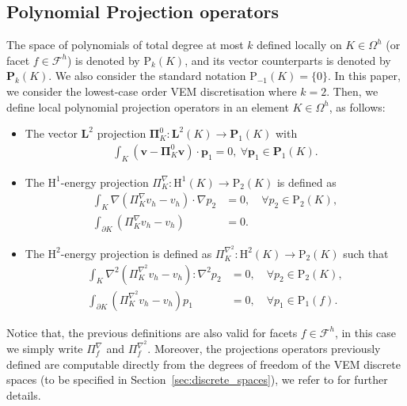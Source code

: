 \documentclass[final,reqno]{elsarticle}
\newcommand\rP{\mathrm{P}}
\def\bL{\mathbf{L}}
\def\bP{\mathbf{P}}
\def\bp{\mathbf{p}}
\def\bv{\mathbf{v}}
\def\bPi{\mathbf{\Pi}}
\def\rH{\mathrm{H}}
\def\rP{\mathrm{P}}
\begin{document}
\subsection{Polynomial Projection operators}
The space of polynomials of total degree at most $k$ defined locally on $K\in \Omega^h$ (or facet $f\in \mathcal{F}^h$) is denoted by $\rP_k (K)$, and its vector counterparts is denoted by $\mathbf{P}_k(K)$. We also consider the standard notation $\rP_{-1}(K)=\{0\}$. In this paper, we consider the lowest-case order VEM discretisation where $k=2$. Then, we define local polynomial projection operators in an element $K\in \Omega^h$, as follows:
\begin{itemize}
        \item The vector $\bL^2$ projection $\bPi_{K}^{0}:\bL^2(K)\rightarrow \bP_{1}(K)$ with
    \begin{align}\label{PiVector}
        \int_K \left(\bv-\bPi_{K}^{0}\bv\right)\cdot \bp_{1} = 0, \ \forall \bp_{1} \in \bP_{1}(K).
    \end{align}
    \item The $\rH^1$-energy projection $\Pi_{K}^{\nabla}:\rH^{1}(K)\to\rP_{2}(K)$ is defined as
    \begin{subequations}
        \begin{align*}
            \int_K \nabla (\Pi_{K}^{\nabla} v_h -v_h)\cdot \nabla p_2  &= 0,\quad \forall p_2\in \rP_2(K),\\
            \int_{\partial K} (\Pi_{K}^{\nabla} v_h -v_h) &= 0.
        \end{align*}
    \end{subequations}
    \item The $\rH^2$-energy projection is defined as 
    $\Pi_{K}^{\nabla^2}:\rH^2(K)\to\rP_{2}(K)$ such that
    \begin{subequations}
        \begin{align*}
            \int_K \nabla^2 (\Pi_{K}^{\nabla^2} v_h -v_h): \nabla^2 p_2 &= 0, \quad \forall p_2\in \rP_2(K),\\
            \int_{\partial K} (\Pi_{K}^{\nabla^2} v_h -v_h)p_1&=0, \quad \forall p_1\in \rP_1(f).
        \end{align*}
    \end{subequations}
\end{itemize}
Notice that, the previous definitions are also valid for facets $f\in \mathcal{F}^h$, in this case we simply write $\Pi_{f}^{\nabla}$ and $\Pi_{f}^{\nabla^2}$. Moreover, the projections operators previously defined are computable directly from the degrees of freedom of the VEM discrete spaces (to be specified in Section~\ref{sec:discrete_spaces}), we refer to \cite{ABSV2016,BDR2019C1Polyhedral} for further details. 
\end{document}
